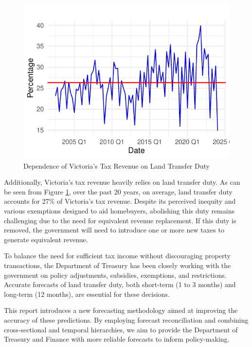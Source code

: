 \documentclass[11pt,a4paper,]{article}
\begin{document}
\begin{figure}[H]

{\centering \includegraphics{Final_Report_files/figure-latex/taxrevenue-1} 

}

\caption{Dependence of Victoria's Tax Revenue on Land Transfer Duty}\label{fig:taxrevenue}
\end{figure}

Additionally, Victoria's tax revenue heavily relies on land transfer duty. As can be seen from Figure \ref{fig:taxrevenue}, over the past 20 years, on average, land transfer duty accounts for 27\% of Victoria's tax revenue. Despite its perceived inequity and various exemptions designed to aid homebuyers, abolishing this duty remains challenging due to the need for equivalent revenue replacement. If this duty is removed, the government will need to introduce one or more new taxes to generate equivalent revenue.

To balance the need for sufficient tax income without discouraging property transactions, the Department of Treasury has been closely working with the government on policy adjustments, subsidies, exemptions, and restrictions. Accurate forecasts of land transfer duty, both short-term (1 to 3 months) and long-term (12 months), are essential for these decisions.

This report introduces a new forecasting methodology aimed at improving the accuracy of these predictions. By employing forecast reconciliation and combining cross-sectional and temporal hierarchies, we aim to provide the Department of Treasury and Finance with more reliable forecasts to inform policy-making.
\end{document}
